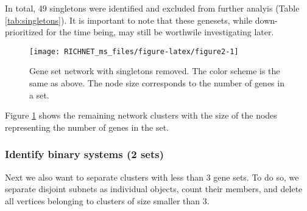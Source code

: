 \documentclass[9pt,a4paper,]{extarticle}
\newenvironment{Shaded}{\begin{snugshade}}{\end{snugshade}}
\newcommand{\KeywordTok}[1]{\textcolor[rgb]{0.13,0.29,0.53}{\textbf{#1}}}
\newcommand{\DataTypeTok}[1]{\textcolor[rgb]{0.13,0.29,0.53}{#1}}
\newcommand{\DecValTok}[1]{\textcolor[rgb]{0.00,0.00,0.81}{#1}}
\newcommand{\StringTok}[1]{\textcolor[rgb]{0.31,0.60,0.02}{#1}}
\newcommand{\OperatorTok}[1]{\textcolor[rgb]{0.81,0.36,0.00}{\textbf{#1}}}
\newcommand{\NormalTok}[1]{#1}
\theoremstyle{definition}
\theoremstyle{definition}
\theoremstyle{definition}
\theoremstyle{remark}
\begin{document}
In total, 49 singletons were identified and excluded from further analyis (Table \ref{tab:singletons}). It is important to note that these genesets, while down-prioritized for the time being, may still be worthwile investigating later.

\begin{figure}

{\centering \texttt{[image: RICHNET\_ms\_files/figure-latex/figure2-1]} 

}

\caption{Gene set network with singletons removed. The color scheme is the same as above. The node size corresponds to the number of genes in a set.}\label{fig:figure2}
\end{figure}

\begin{Shaded}
\end{Shaded}

Figure \ref{fig:figure2} shows the remaining network clusters with the size of the nodes representing the number of genes in the set.

\subsubsection{Identify binary systems (2 sets)}\label{identify-binary-systems-2-sets}

Next we also want to separate clusters with less than 3 gene sets. To do so, we separate disjoint subnets as individual objects, count their members, and delete all vertices belonging to clusters of size smaller than 3.
\end{document}
